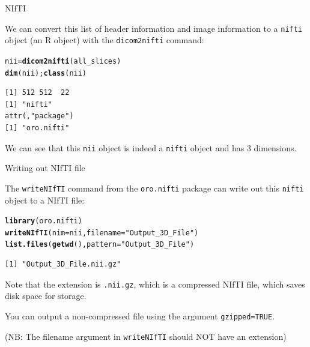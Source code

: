 \documentclass[11pt]{beamer}\usepackage[]{graphicx}\usepackage[]{color}
\makeatletter
\newcommand{\hlstr}[1]{\textcolor[rgb]{0.192,0.494,0.8}{#1}}%
\newcommand{\hlstd}[1]{\textcolor[rgb]{0.345,0.345,0.345}{#1}}%
\newcommand{\hlkwb}[1]{\textcolor[rgb]{0.69,0.353,0.396}{#1}}%
\newcommand{\hlkwc}[1]{\textcolor[rgb]{0.333,0.667,0.333}{#1}}%
\newcommand{\hlkwd}[1]{\textcolor[rgb]{0.737,0.353,0.396}{\textbf{#1}}}%
\newenvironment{kframe}{%
 \def\at@end@of@kframe{}%
 \ifinner\ifhmode%
  \def\at@end@of@kframe{\end{minipage}}%
  \begin{minipage}{\columnwidth}%
 \fi\fi%
 \def\FrameCommand##1{\hskip\@totalleftmargin \hskip-\fboxsep
 \colorbox{shadecolor}{##1}\hskip-\fboxsep
     \hskip-\linewidth \hskip-\@totalleftmargin \hskip\columnwidth}%
 \MakeFramed {\advance\hsize-\width
   \@totalleftmargin\z@ \linewidth\hsize
   \@setminipage}}%
 {\par\unskip\endMakeFramed%
 \at@end@of@kframe}
\newenvironment{knitrout}{}{} %
\makeatother
\begin{document}
\begin{frame}[fragile]{NIfTI}

We can convert this list of header information and image information to a \verb|nifti| object (an R object) with the \verb|dicom2nifti| command:
\begin{knitrout}
\color{fgcolor}\begin{kframe}
\begin{alltt}
\hlstd{nii} \hlkwb{=} \hlkwd{dicom2nifti}\hlstd{(all_slices)}
\hlkwd{dim}\hlstd{(nii);} \hlkwd{class}\hlstd{(nii)}
\end{alltt}
\begin{verbatim}
[1] 512 512  22
[1] "nifti"
attr(,"package")
[1] "oro.nifti"
\end{verbatim}
\end{kframe}
\end{knitrout}
We can see that this \verb|nii| object is indeed a \verb|nifti| object and has 3 dimensions. 

\end{frame}

\begin{frame}[fragile]{Writing out NIfTI file}

The \verb|writeNIfTI| command from the \verb|oro.nifti| package can write out this \verb|nifti| object to a NIfTI file:

\begin{knitrout}
\color{fgcolor}\begin{kframe}
\begin{alltt}
\hlkwd{library}\hlstd{(oro.nifti)}
\hlkwd{writeNIfTI}\hlstd{(}\hlkwc{nim} \hlstd{= nii,} \hlkwc{filename} \hlstd{=} \hlstr{"Output_3D_File"}\hlstd{)}
\hlkwd{list.files}\hlstd{(}\hlkwd{getwd}\hlstd{(),} \hlkwc{pattern} \hlstd{=} \hlstr{"Output_3D_File"}\hlstd{)}
\end{alltt}
\begin{verbatim}
[1] "Output_3D_File.nii.gz"
\end{verbatim}
\end{kframe}
\end{knitrout}
Note that the extension is \verb|.nii.gz|, which is a compressed NIfTI file, which saves disk space for storage.

You can output a non-compressed file using the argument \verb|gzipped=TRUE|.

(NB: The filename argument in \verb|writeNIfTI| should NOT have an extension)

\end{frame}
\end{document}
